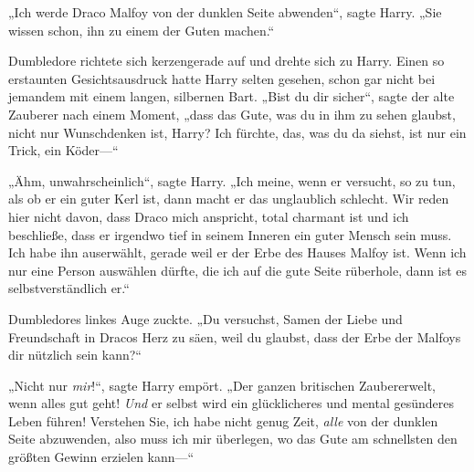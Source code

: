 „Ich werde Draco Malfoy von der dunklen Seite abwenden“, sagte Harry. „Sie wissen schon, ihn zu einem der Guten machen.“

Dumbledore richtete sich kerzengerade auf und drehte sich zu Harry. Einen so erstaunten Gesichtsausdruck hatte Harry selten gesehen, schon gar nicht bei jemandem mit einem langen, silbernen Bart. „Bist du dir sicher“, sagte der alte Zauberer nach einem Moment, „dass das Gute, was du in ihm zu sehen glaubst, nicht nur Wunschdenken ist, Harry? Ich fürchte, das, was du da siehst, ist nur ein Trick, ein Köder—“

„Ähm, unwahrscheinlich“, sagte Harry. „Ich meine, wenn er versucht, so zu tun, als ob er ein guter Kerl ist, dann macht er das unglaublich schlecht. Wir reden hier nicht davon, dass Draco mich anspricht, total charmant ist und ich beschließe, dass er irgendwo tief in seinem Inneren ein guter Mensch sein muss. Ich habe ihn auserwählt, gerade weil er der Erbe des Hauses Malfoy ist. Wenn ich nur eine Person auswählen dürfte, die ich auf die gute Seite rüberhole, dann ist es selbstverständlich er.“

Dumbledores linkes Auge zuckte. „Du versuchst, Samen der Liebe und Freundschaft in Dracos Herz zu säen, weil du glaubst, dass der Erbe der Malfoys dir nützlich sein kann?“

„Nicht nur \emph{mir}!“, sagte Harry empört. „Der ganzen britischen Zaubererwelt, wenn alles gut geht! \emph{Und} er selbst wird ein glücklicheres und mental gesünderes Leben führen! Verstehen Sie, ich habe nicht genug Zeit, \emph{alle} von der dunklen Seite abzuwenden, also muss ich mir überlegen, wo das Gute am schnellsten den größten Gewinn erzielen kann—“

